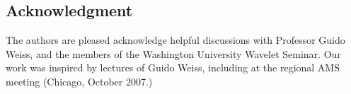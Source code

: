 \documentclass{birkmult}
\theoremstyle{definition}
\theoremstyle{remark}
\numberwithin{equation}{section}
\begin{document}




\subsection*{Acknowledgment}
The authors are pleased acknowledge helpful discussions
with Professor Guido Weiss, and the members of the Washington University
Wavelet Seminar. Our work was inspired by lectures of Guido Weiss,
including at the regional AMS meeting (Chicago, October 2007.)
\end{document}

